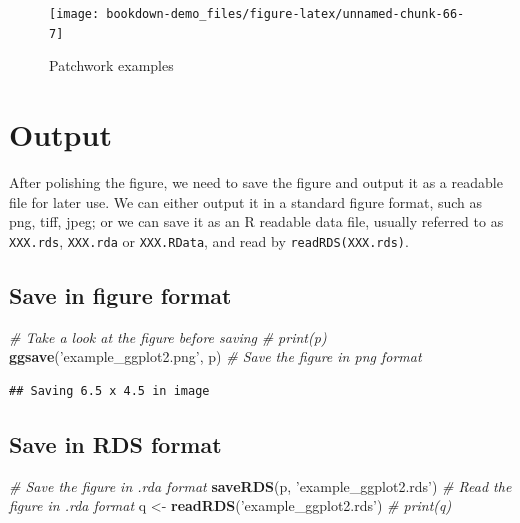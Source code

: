 \documentclass[]{book}
\newenvironment{Shaded}{\begin{snugshade}}{\end{snugshade}}
\newcommand{\KeywordTok}[1]{\textcolor[rgb]{0.13,0.29,0.53}{\textbf{#1}}}
\newcommand{\StringTok}[1]{\textcolor[rgb]{0.31,0.60,0.02}{#1}}
\newcommand{\CommentTok}[1]{\textcolor[rgb]{0.56,0.35,0.01}{\textit{#1}}}
\newcommand{\NormalTok}[1]{#1}
\begin{document}
\begin{figure}

{\centering \texttt{[image: bookdown-demo\_files/figure-latex/unnamed-chunk-66-7]} 

}

\caption{Patchwork examples}\label{fig:unnamed-chunk-66-7}
\end{figure}

\section{Output}\label{output}

After polishing the figure, we need to save the figure and output it as
a readable file for later use. We can either output it in a standard
figure format, such as png, tiff, jpeg; or we can save it as an R
readable data file, usually referred to as \texttt{XXX.rds},
\texttt{XXX.rda} or \texttt{XXX.RData}, and read by
\texttt{readRDS(\textquotesingle{}XXX.rds\textquotesingle{})}.

\subsection{Save in figure format}\label{save-in-figure-format}

\begin{Shaded}
\begin{Highlighting}[]
\CommentTok{# Take a look at the figure before saving}
\CommentTok{# print(p) }
\KeywordTok{ggsave}\NormalTok{(}\StringTok{'example_ggplot2.png'}\NormalTok{, p) }\CommentTok{# Save the figure in png format}
\end{Highlighting}
\end{Shaded}

\begin{verbatim}
## Saving 6.5 x 4.5 in image
\end{verbatim}

\subsection{Save in RDS format}\label{save-in-rds-format}

\begin{Shaded}
\begin{Highlighting}[]
\CommentTok{# Save the figure in .rda format}
\KeywordTok{saveRDS}\NormalTok{(p, }\StringTok{'example_ggplot2.rds'}\NormalTok{) }
\CommentTok{# Read the figure in .rda format}
\NormalTok{q <-}\StringTok{ }\KeywordTok{readRDS}\NormalTok{(}\StringTok{'example_ggplot2.rds'}\NormalTok{)}
\CommentTok{# print(q)}
\end{Highlighting}
\end{Shaded}
\end{document}

